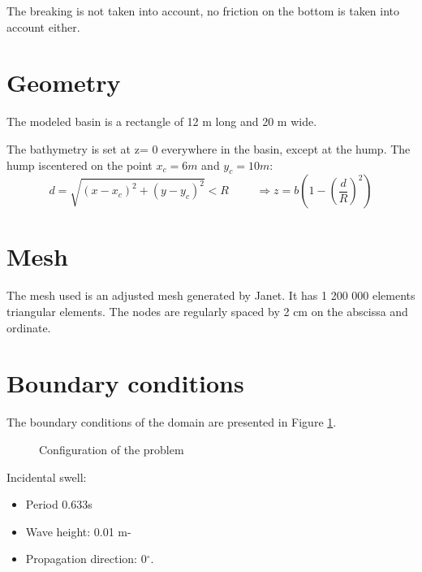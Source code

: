 The breaking is not taken into account, no friction on the bottom is taken into account either.

\section{Geometry}
\label{bosse_geom}
The modeled basin is a rectangle of 12 m long and 20 m wide.

The bathymetry is set at z= 0 everywhere in the basin, except at the hump. The
hump iscentered on the point $x_c=6m$ and $y_c=10m$:
$$
d= \sqrt{(x-x_c)^2+(y-y_c)^2}< R \hspace{1cm} \Rightarrow z =b(1-(\frac{d}{R})^2)
$$

\section{Mesh}

The mesh used is an adjusted mesh generated by Janet. It has 1 200 000
elements triangular elements. The nodes are regularly spaced by 2 cm on the
abscissa and ordinate.

\section{Boundary conditions}

The boundary conditions of the domain are presented in Figure
\ref{fig:bc_bosse}.

\begin{figure}[h]
\begin{center}
\end{center}
\caption{Configuration of the problem}
\label{fig:bc_bosse}
\end{figure}

Incidental swell:
\begin{itemize}
\item Period 0.633s
\item Wave height: 0.01 m-
\item Propagation direction: 0$^\circ$.
\item Exit direction: 0$^\circ$.
\item Phase (ALFAP) : 0$^\circ$ on the whole liquid boundary
\end{itemize}
Wall:
\begin{itemize}
\item Reflection coefficient = 1.
\item Phase shift : 0$^\circ$
\item Angle of attack: 0$^\circ$
\end{itemize}
Free exit:
\begin{itemize}
\item Angle of attack of the outgoing waves: 0$^\circ$.
\end{itemize}


